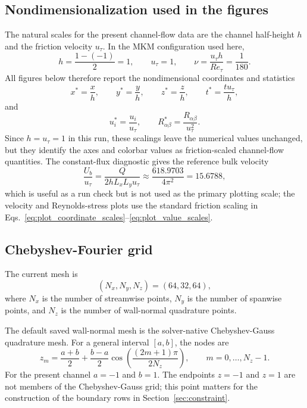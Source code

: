 \documentclass[11pt]{article}
\begin{document}
\subsection{Nondimensionalization used in the figures}

The natural scales for the present channel-flow data are the channel
half-height \(h\) and the friction velocity \(u_{\tau}\). In the MKM
configuration used here,
\[
  h=\frac{1-(-1)}{2}=1,\qquad u_{\tau}=1,\qquad
  \nu=\frac{u_{\tau}h}{Re_{\tau}}=\frac{1}{180}.
\]
All figures below therefore report the nondimensional coordinates and
statistics
\begin{equation}
  x^*=\frac{x}{h},\qquad y^*=\frac{y}{h},\qquad
  z^*=\frac{z}{h},\qquad t^*=\frac{t u_{\tau}}{h},
  \label{eq:plot_coordinate_scales}
\end{equation}
and
\begin{equation}
  u_i^*=\frac{u_i}{u_{\tau}},\qquad
  R_{\alpha\beta}^*=\frac{R_{\alpha\beta}}{u_{\tau}^2}.
  \label{eq:plot_value_scales}
\end{equation}
Since \(h=u_{\tau}=1\) in this run, these scalings leave the numerical values
unchanged, but they identify the axes and colorbar values as friction-scaled
channel-flow quantities. The constant-flux diagnostic gives the reference bulk
velocity
\begin{equation}
  \frac{U_b}{u_{\tau}}
  =
  \frac{Q}{2hL_xL_yu_{\tau}}
  \approx
  \frac{618.9703}{4\pi^2}
  =
  15.6788,
  \label{eq:bulk_velocity_reference}
\end{equation}
which is useful as a run check but is not used as the primary plotting scale;
the velocity and Reynolds-stress plots use the standard friction scaling in
Eqs.~\eqref{eq:plot_coordinate_scales}--\eqref{eq:plot_value_scales}.

\subsection{Chebyshev-Fourier grid}

The current mesh is
\[
  (N_x,N_y,N_z) = (64,32,64),
\]
where \(N_x\) is the number of streamwise points, \(N_y\) is the number of
spanwise points, and \(N_z\) is the number of wall-normal quadrature points.

The default saved wall-normal mesh is the solver-native Chebyshev-Gauss
quadrature mesh. For a general interval \([a,b]\), the nodes are
\begin{equation}
  z_m = \frac{a+b}{2} + \frac{b-a}{2}
        \cos\left(\frac{(2m+1)\pi}{2N_z}\right),
  \qquad m=0,\ldots,N_z-1.
  \label{eq:cheb_gauss_nodes}
\end{equation}
For the present channel \(a=-1\) and \(b=1\). The endpoints \(z=-1\) and
\(z=1\) are not members of the Chebyshev-Gauss grid; this point matters for
the construction of the boundary rows in Section~\ref{sec:constraint}.
\end{document}
